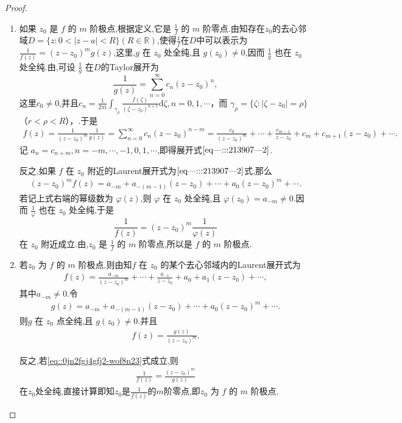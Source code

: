 \documentclass[../../main.tex]{subfiles}%
\begin{document}
\begin{proof}
\begin{enumerate}[(1)]
\item 如果 \( z_0 \) 是 \( f \) 的 \( m \) 阶极点,根据定义,它是 \( \frac{1}{f} \) 的 \( m \) 阶零点.由知存在$z_0$的去心邻域$D=\{z:0<|z-a|<R\}(R\in\mathbb{R})$,使得$\frac{1}{f}$在$D$中可以表示为 \( \frac{1}{f(z)} = (z - z_0)^m g(z) \),这里,\( g \) 在 \( z_0 \) 处全纯,且 \( g(z_0) \neq 0 \),因而 \( \frac{1}{g} \) 也在 \( z_0 \) 处全纯.由,可设 \( \frac{1}{g} \) 在$D$的Taylor展开为
\[
\frac{1}{g(z)} = \sum_{n=0}^{\infty} c_n (z - z_0)^n,
\]
这里\( c_0 \neq 0 \),并且\( c_n = \frac{1}{2\pi \mathrm{i}} \int_{\gamma_{\rho}} \frac{f(\zeta)}{(\zeta - z_0)^{n + 1}} \mathrm{d}\zeta,n=0,1,\cdots \)，而 \( \gamma_{\rho} = \{ \zeta: |\zeta - z_0| = \rho \} \)（\( r < \rho < R \)），.于是
\begin{align*}
f(z) = \frac{1}{(z - z_0)^m} \frac{1}{g(z)} = \sum_{n=0}^{\infty} c_n (z - z_0)^{n - m} = \frac{c_0}{(z - z_0)^m} + \cdots + \frac{c_{m - 1}}{z - z_0} + c_m + c_{m + 1}(z - z_0) + \cdots.
\end{align*}
记 \( a_n = c_{n + m}, n = -m, \cdots, -1, 0, 1, \cdots \),即得展开式\(\eqref{eq---:::213907---2}\).

反之,如果 \( f \) 在 \( z_0 \) 附近的Laurent展开式为\(\eqref{eq---:::213907---2}\)式,那么
\begin{align*}
(z - z_0)^m f(z) = a_{-m} + a_{-(m - 1)}(z - z_0) + \cdots + a_0(z - z_0)^m + \cdots.
\end{align*}
若记上式右端的幂级数为 \( \varphi(z) \),则 \( \varphi \) 在 \( z_0 \) 处全纯,且 \( \varphi(z_0) = a_{-m} \neq 0 \).因而 \( \frac{1}{\varphi} \) 也在 \( z_0 \) 处全纯,于是
\[
\frac{1}{f(z)} = (z - z_0)^m \frac{1}{\varphi(z)}
\]
在 \( z_0 \) 附近成立.由,\( z_0 \) 是 \( \frac{1}{f} \) 的 \( m \) 阶零点,所以是 \( f \) 的 \( m \) 阶极点.

\item 若\( z_0 \) 为 \( f \) 的 \( m \) 阶极点,则由知\( f \) 在 \( z_0 \) 的某个去心邻域内的Laurent展开式为
\begin{align*}
f(z) = \frac{a_{-m}}{(z - z_0)^m} + \cdots + \frac{a_{-1}}{z - z_0} + a_0 + a_1(z - z_0) + \cdots,
\end{align*}
其中\( a_{-m} \neq 0 \).令
\begin{align*}
g(z) = a_{-m} + a_{-(m - 1)}(z - z_0) + \cdots + a_0(z - z_0)^m + \cdots.
\end{align*}
则\( g \) 在 \( z_0 \) 点全纯,且 \( g(z_0) \neq 0 \).并且
\begin{align*}
f(z) = \frac{g(z)}{(z-z_0)^m}.
\end{align*}

反之,若\eqref{eq::0jn2fgj4gfj2-wof8n23}式成立,则
\begin{align*}
\frac{1}{f(z)}=\frac{(z-z_0)^m}{g(z)}
\end{align*}
在$z_0$处全纯,直接计算即知$z_0$是$\frac{1}{f(z)}$的$m$阶零点,即\( z_0 \) 为 \( f \) 的 \( m \) 阶极点.
\end{enumerate}

\end{proof}
\end{document}
